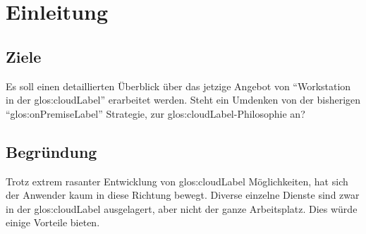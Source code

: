 \chapter{Einleitung}

\section{Ziele}
Es soll einen detaillierten Überblick über das jetzige Angebot von “Workstation in der \Gls{glos:cloudLabel}” erarbeitet werden.
Steht ein Umdenken von der bisherigen "`\gls{glos:onPremiseLabel}"' Strategie, zur \Gls{glos:cloudLabel}-Philosophie an?

\section{Begründung}
Trotz extrem rasanter Entwicklung von \Gls{glos:cloudLabel} Möglichkeiten, hat sich der Anwender kaum in diese Richtung bewegt.
Diverse einzelne Dienste sind zwar in der \Gls{glos:cloudLabel} ausgelagert, aber nicht der ganze Arbeitsplatz. Dies würde einige Vorteile bieten.

